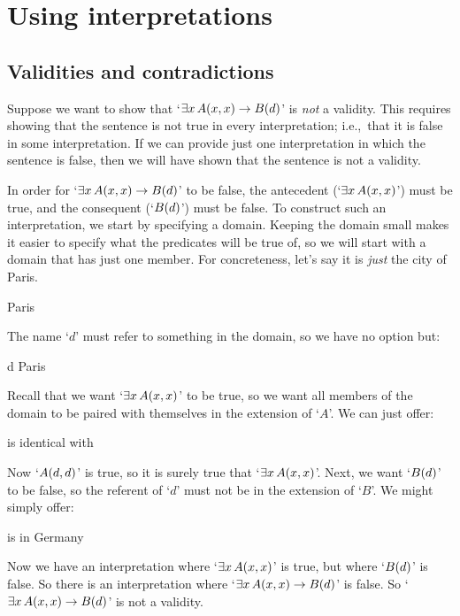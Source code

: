 \chapter{Using interpretations}
\label{sec.UsingModels}

\section{Validities and contradictions}
Suppose we want to show that `$\exists x\, \mathord{A}(x,x) \rightarrow \mathord{B}(d)$' is \emph{not} a validity. This requires showing that the sentence is not true in every interpretation; i.e.,\ that it is false in some interpretation. If we can provide just one interpretation in which the sentence is false, then we will have shown that the sentence is not a validity.

In order for `$\exists x\,\mathord{A}(x,x) \rightarrow \mathord{B}(d)$' to be false, the antecedent (`$\exists x\, \mathord{A}(x,x)$') must be true, and the consequent (`$\mathord{B}(d)$') must be false. To construct such an interpretation, we start by specifying a domain. Keeping the domain small makes it easier to specify what the predicates will be true of, so we will start with a domain that has just one member. For concreteness, let's say it is \emph{just} the city of Paris. 
	\begin{ekey}
		\item[\text{domain}] Paris
	\end{ekey}
The name `$d$' must refer to something in the domain, so we have no option but:
	\begin{ekey}
		\item[d] Paris
	\end{ekey}
Recall that we want `$\exists x\, \mathord{A}(x,x)$' to be true, so we want all members of the domain to be paired with themselves in the extension of `$A$'. We can just offer:
	\begin{ekey}
		\item[\atom{A}{x,y}]  is identical with 
	\end{ekey}
Now `$\mathord{A}(d,d)$' is true, so it is surely true that `$\exists x\, \mathord{A}(x,x)$'. Next, we want `$\mathord{B}(d)$' to be false, so the referent of `$d$' must not be in the extension of `$B$'. We might simply offer:
	\begin{ekey}
		\item[\atom{B}{x}]  is in Germany
	\end{ekey}
Now we have an interpretation where `$\exists x\, \mathord{A}(x,x)$' is true, but where `$\mathord{B}(d)$' is false. So there is an interpretation where `$\exists x\, \mathord{A}(x,x) \rightarrow \mathord{B}(d)$' is false. So `$\exists x\, \mathord{A}(x,x) \rightarrow \mathord{B}(d)$' is not a validity.

